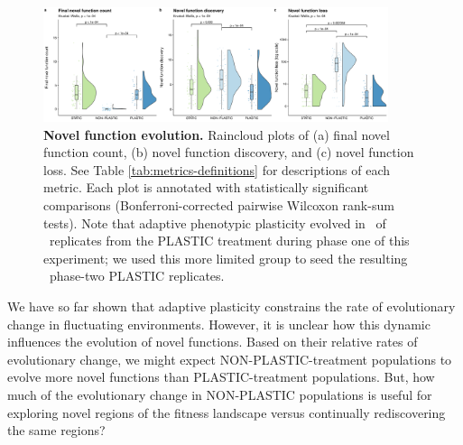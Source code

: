 \begin{raggedbottom}
\begin{figure}[h!]
  \centering
  \includegraphics[width=0.9\textwidth]{05_consequences_of_plasticity/media/media-complex-traits-magnitude-panel.pdf}
  \caption{\small
  \textbf{Novel function evolution.}
  Raincloud plots of
  (a) final novel function count,
  (b) novel function discovery,
  and (c) novel function loss.
  See Table \ref{tab:metrics-definitions} for descriptions of each metric.
  Each plot is annotated with statistically significant comparisons (Bonferroni-corrected pairwise Wilcoxon rank-sum tests).
  Note that adaptive phenotypic plasticity evolved in \novelTraitsPlasticReps\ of \novelTraitsReplicates\ replicates from the PLASTIC treatment during phase one of this experiment; we used this more limited group to seed the resulting \novelTraitsPlasticReps\ phase-two PLASTIC replicates.
  }
  \label{fig:complex-traits-magnitude}
\end{figure}

We have so far shown that adaptive plasticity constrains the rate of evolutionary change in fluctuating environments.
However, it is unclear how this dynamic influences the evolution of novel functions.
Based on their relative rates of evolutionary change, we might expect NON-PLASTIC-treatment populations to evolve more novel functions than PLASTIC-treatment populations.
But, how much of the evolutionary change in NON-PLASTIC populations is useful for exploring novel regions of the fitness landscape versus continually rediscovering the same regions?


\end{raggedbottom}
